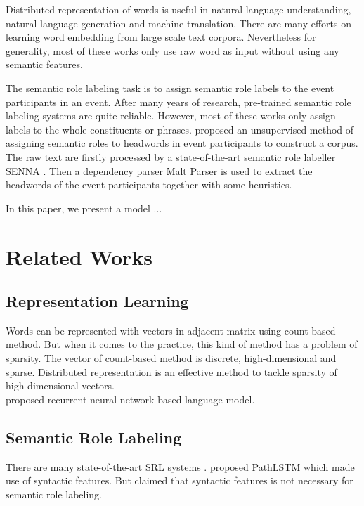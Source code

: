 \documentclass[a4paper]{article}
\begin{document}
\noindent


\noindent
Distributed representation of words is useful in natural language understanding, natural language generation and machine translation. There are many efforts on learning word embedding from large scale text corpora. Nevertheless for generality, most of these works only use raw word as input without using any semantic features. 


\noindent
The semantic role labeling task is to assign semantic role labels to the event participants in an event. After many years of research, pre-trained semantic role labeling systems are quite reliable. However, most of these works only assign labels to the whole constituents or phrases. \citet{Sayeed2014} proposed an unsupervised method of assigning semantic roles to headwords in event participants to construct a corpus. The raw text are firstly processed by a state-of-the-art semantic role labeller SENNA \citep{Collobert}. Then a dependency parser Malt Parser is used to extract the headwords of the event participants together with some heuristics.


\noindent
In this paper, we present a model ...



\section{Related Works}

\subsection{Representation Learning}

Words can be represented with vectors in adjacent matrix using count based method. But when it comes to the practice, this kind of method has a problem of sparsity. The vector of count-based method is discrete, high-dimensional and sparse. Distributed representation is an effective method to tackle sparsity of high-dimensional vectors. \\
\noindent
\citet{mikolov2013distributed} proposed recurrent neural network based language model.

\subsection{Semantic Role Labeling}
There are many state-of-the-art SRL systems \citep{collobert2011natural, titov2011bayesian}. \citet{roth2016neural} proposed PathLSTM which made use of syntactic features. But \citet{marcheggiani2017simple} claimed that syntactic features is not necessary for semantic role labeling.
\end{document}
